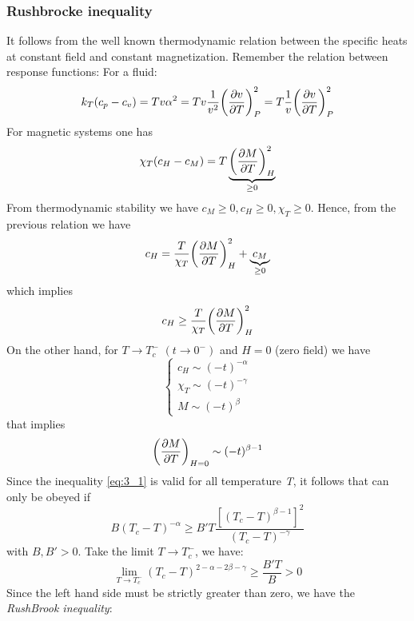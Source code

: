 \documentclass[../../Main/Main.tex]{subfiles}
\begin{document}
\subsubsection{Rushbrocke inequality}
It follows from the well known thermodynamic relation between the specific heats at constant field and constant magnetization.
Remember the relation between response functions:
For a fluid:
\begin{equation*}
   k_T (c_p-c_v)=T v \alpha ^2 = T v \frac{1}{v^2} \qty(\pdv{v}{T} )^2_P = T \frac{1}{v} \qty(\pdv{v}{T} )^2_P
\end{equation*}
For magnetic systems one has
\begin{equation*}
  \chi _T (c_H-c_M) = T \underbrace{ \qty(\pdv{M}{T} )^2_H }_{\geq 0}
\end{equation*}
From thermodynamic stability we have \( c_M \geq 0, c_H \geq 0, \chi _T \geq 0  \).
Hence, from the previous relation we have
\begin{equation*}
   c_H = \frac{T}{\chi _T} \qty(\pdv{M}{T} )^2_H + \underbrace{c_M}_{\ge0}
\end{equation*}
which implies
\begin{equation}
   c_H \ge \frac{T}{\chi _T} \qty(\pdv{M}{T} )^2_H 
   \label{eq:3_1}
\end{equation}
On the other hand, for \( T \rightarrow T_c^- \) \( (t \rightarrow 0^-) \) and \( H=0 \) (zero field) we have
\begin{equation*}
  \begin{cases}
   c_H \sim (-t)^{-\alpha }\\
   \chi _T \sim (-t)^{-\gamma  } \\
    M \sim (-t)^{\beta }
  \end{cases}
\end{equation*}
that implies
\begin{equation*}
 \qty( \pdv{M}{T})_{H=0} \sim (-t)^{\beta -1}    
\end{equation*}
Since the inequality \eqref{eq:3_1} is valid for all temperature \emph{T}, it follows that can only be obeyed if
\begin{equation*}
  B (T_c - T)^{-\alpha } \ge B' T \frac{[(T_c - T)^{\beta -1}]^2}{(T_c-T)^{-\gamma  }}
\end{equation*}
with \( B,B' > 0 \). Take the limit \( T \rightarrow T_c^- \), we have:
\begin{equation*}
  \lim_{T \rightarrow T_c^-} (T_c - T)^{2- \alpha - 2 \beta - \gamma  } \ge \frac{B' T}{B} > 0
\end{equation*}
Since the left hand side must be strictly greater than zero, we have the \textit{RushBrook inequality}:
\end{document}

